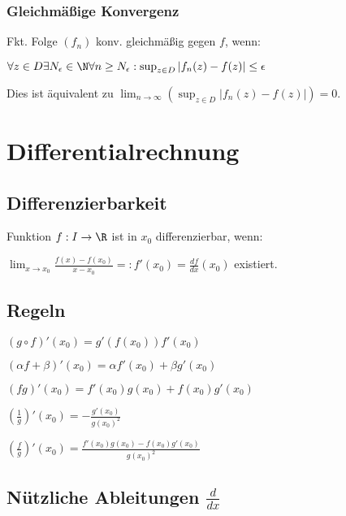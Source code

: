 \subsubsection*{Gleichmäßige Konvergenz}

Fkt. Folge $(f_n)$ konv. gleichmäßig gegen $f$, wenn:

$\forall z \in D \exists N_\epsilon \in \N \forall n \geq N_\epsilon : \sup_{z \in D} | f_n(z) - f(z) | \leq \epsilon$

Dies ist äquivalent zu $\displaystyle\lim_{n\to \infty}(\sup_{z \in D}| f_n(z) - f(z) |) = 0$.

\section*{Differentialrechnung}

\subsection*{Differenzierbarkeit}

Funktion $f : I \rightarrow \R$ ist in $x_0$ differenzierbar, wenn:

$\lim_{x \to x_0} \frac{f(x) - f(x_0)}{x - x_0} =: f'(x_0) = \frac{df}{dx}(x_0)$ existiert.

\subsection*{Regeln}

\begin{description}[leftmargin=!,labelwidth=17mm]
	\item[Ketten]     $(g \circ f)'(x_0) =g'(f(x_0))f'(x_0)$
	\item[Produkt]    $(\alpha f + \beta)'(x_0) = \alpha f'(x_0) + \beta g'(x_0)$
	\item[ ]          $(fg)'(x_0) = f'(x_0)g(x_0) + f(x_0)g'(x_0)$
	\item[Quotienten] $(\frac{1}{g})'(x_0) = - \frac{g'(x_0)}{g(x_0)^2}$
	\item[ ]          $(\frac{f}{g})'(x_0) = \frac{f'(x_0)g(x_0) - f(x_0)g'(x_0)}{g(x_0)^2}$
\end{description}

\subsection*{Nützliche Ableitungen $\frac{d}{dx}$}

